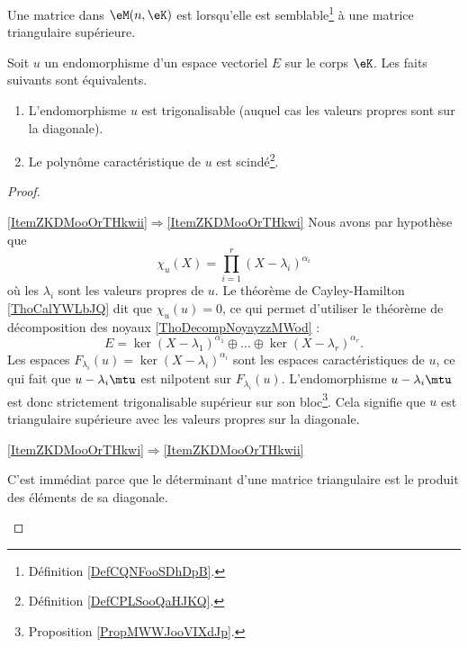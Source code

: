 \begin{definition}
    Une matrice dans \( \eM(n,\eK)\) est  lorsqu'elle est semblable\footnote{Définition \ref{DefCQNFooSDhDpB}.} à une matrice triangulaire supérieure.
\end{definition}

\begin{proposition} \label{PropKNVFooQflQsJ}
    Soit \( u\) un endomorphisme d'un espace vectoriel \( E\) sur le corps \( \eK\). Les faits suivants sont équivalents.
    \begin{enumerate}
        \item   \label{ItemZKDMooOrTHkwi}
            L'endomorphisme \( u\) est trigonalisable (auquel cas les valeurs propres sont sur la diagonale).
        \item   \label{ItemZKDMooOrTHkwii}
            Le polynôme caractéristique de \( u\) est scindé\footnote{Définition \ref{DefCPLSooQaHJKQ}.}.
    \end{enumerate}
\end{proposition}

\begin{proof}
    \begin{subproof}
        \item[\ref{ItemZKDMooOrTHkwii}\( \Rightarrow\)\ref{ItemZKDMooOrTHkwi}]
            Nous avons par hypothèse que
            \begin{equation}
                \chi_u(X)=\prod_{i=1}^r(X-\lambda_i)^{\alpha_i}
            \end{equation}
            où les \( \lambda_i\) sont les valeurs propres de \( u\). Le théorème de Cayley-Hamilton \ref{ThoCalYWLbJQ} dit que \( \chi_u(u)=0\), ce qui permet d'utiliser le théorème de décomposition des noyaux \ref{ThoDecompNoyayzzMWod} :
            \begin{equation}
                E=\ker(X-\lambda_1)^{\alpha_1}\oplus\ldots\oplus\ker(X-\lambda_r)^{\alpha_r}.
            \end{equation}
            Les espaces \( F_{\lambda_i}(u)=\ker(X-\lambda_i)^{\alpha_i}\) sont les espaces caractéristiques de \( u\), ce qui fait que \( u-\lambda_i\mtu\) est nilpotent sur \( F_{\lambda_i}(u)\). L'endomorphisme \( u-\lambda_i\mtu\) est donc strictement trigonalisable supérieur sur son bloc\footnote{Proposition \ref{PropMWWJooVIXdJp}.}. Cela signifie que \( u\) est triangulaire supérieure avec les valeurs propres sur la diagonale.

        \item[\ref{ItemZKDMooOrTHkwi}\( \Rightarrow\)\ref{ItemZKDMooOrTHkwii}]

            C'est immédiat parce que le déterminant d'une matrice triangulaire est le produit des éléments de sa diagonale.
    \end{subproof}
\end{proof}

